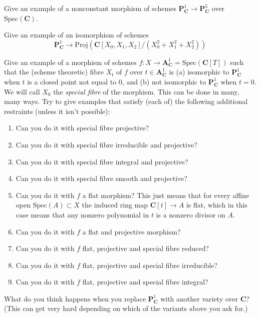 \begin{exercise}
\label{exercise-nonconstant-morphism-proj}
Give an example of a nonconstant morphism
of schemes ${\mathbf P}^1_{\mathbf C} \to {\mathbf P}^5_{\mathbf C}$ over
$\text{Spec}({\mathbf C})$.
\end{exercise}

\begin{exercise}
\label{exercise-isomorphism-P1-conic}
Give an example of an isomorphism of schemes
$$
{\mathbf P}^1_{\mathbf C} \to
\text{Proj}({\mathbf C}[X_0, X_1, X_2]/(X_0^2 + X_1^2 + X_2^2))
$$
\end{exercise}

\begin{exercise}
\label{exercise-family-special-fibre-different}
Give an example of a morphism of schemes
$f : X \to {\mathbf A}^1_{\mathbf C} = \text{Spec}({\mathbf C}[T])$
such that the (scheme theoretic) fibre $X_t$ of $f$ over
$t \in {\mathbf A}^1_{\mathbf C}$ is
(a) isomorphic to ${\mathbf P}^1_{\mathbf C}$ when $t$
is a closed point not equal to $0$, and
(b) not isomorphic to ${\mathbf P}^1_{\mathbf C}$ when $t = 0$.
We will call $X_0$ the {\it special fibre} of the morphism.
This can be done in many, many ways. Try to give examples that
satisfy (each of) the following additional restraints (unless
it isn't possible):
\begin{enumerate}
\item Can you do it with special fibre projective?
\item Can you do it with special fibre irreducible and projective?
\item Can you do it with special fibre integral and projective?
\item Can you do it with special fibre smooth and projective?
\item Can you do it with $f$ a flat morphism?
This just means that for every affine open $\text{Spec}(A) \subset X$ the
induced ring map $\mathbf{C}[t] \to A$ is flat, which in this case means
that any nonzero polynomial in $t$ is a nonzero divisor on $A$.
\item Can you do it with $f$ a flat and projective morphism?
\item Can you do it with $f$ flat, projective and special fibre reduced?
\item Can you do it with $f$ flat, projective and special fibre irreducible?
\item Can you do it with $f$ flat, projective and special fibre integral?
\end{enumerate}
What do you think happens when you replace
${\mathbf P}^1_{\mathbf C}$ with another variety over ${\mathbf C}$?
(This can get very hard depending on which of the variants above you
ask for.)
\end{exercise}

